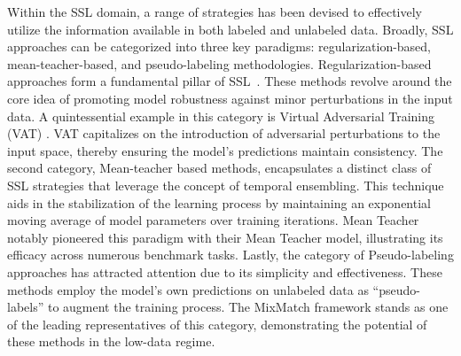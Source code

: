 Within the SSL domain, a range of strategies has been devised to effectively utilize the information available in both labeled and unlabeled data. Broadly, SSL approaches can be categorized into three key paradigms: regularization-based, mean-teacher-based, and pseudo-labeling methodologies. 
Regularization-based approaches form a fundamental pillar of SSL~\cite{miyato2018virtual,laine2017temporal,zhang2020consistency}. 
These methods revolve around the core idea of promoting model robustness against minor perturbations in the input data. A quintessential example in this category is Virtual Adversarial Training (VAT) \cite{miyato2018virtual}. VAT capitalizes on the introduction of adversarial perturbations to the input space, thereby ensuring the model's predictions maintain consistency. The second category, Mean-teacher based methods, encapsulates a distinct class of SSL strategies that leverage the concept of temporal ensembling. This technique aids in the stabilization of the learning process by maintaining an exponential moving average of model parameters over training iterations. Mean Teacher \cite{tarvainen2017mean} notably pioneered this paradigm with their Mean Teacher model, illustrating its efficacy across numerous benchmark tasks. Lastly, the category of Pseudo-labeling approaches has attracted attention due to its simplicity and effectiveness. These methods employ the model's own predictions on unlabeled data as ``pseudo-labels'' to augment the training process. The MixMatch \cite{berthelot2019mixmatch} framework stands as one of the leading representatives of this category, demonstrating the potential of these methods in the low-data regime.

